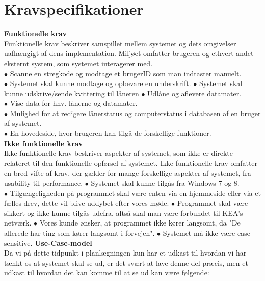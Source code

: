 \documentclass[a4paper]{article}
\begin{document}
\section{Kravspecifikationer}
\textbf{Funktionelle krav}\\
Funktionelle krav beskriver samspillet mellem systemet og dets omgivelser uafhængigt af dens implementation. Miljøet omfatter brugeren og ethvert andet eksternt system, som systemet interagerer med. \cite{OOSE} \\
$\bullet$ Scanne en stregkode og modtage et brugerID som man indtaster manuelt. \\
$\bullet$ Systemet skal kunne modtage og opbevare en underskrift.
$\bullet$ Systemet skal kunne udskrive/sende kvittering til låneren
$\bullet$ Udlåne og aflevere datamater. \\
$\bullet$ Vise data for hhv. lånerne og datamater. \\
$\bullet$ Mulighed for at redigere lånerstatus og computerstatus i databasen af en bruger af systemet. \\
$\bullet$ En hovedeside, hvor brugeren kan tilgå de forskellige funktioner.\\
\textbf{Ikke funktionelle krav}\\
Ikke-funktionelle krav beskriver aspekter af systemet, som ikke er direkte relateret til den funktionelle opførsel af systemet. Ikke-funktionelle krav omfatter en bred vifte af krav, der gælder for mange forskellige aspekter af systemet, fra usability til performance. \cite{OOSE}
$\bullet$ Systemet skal kunne tilgås fra Windows 7 og 8. \\
$\bullet$ Tilgængeligheden på programmet skal være enten via en hjemmeside eller via et fælles drev, dette vil blive uddybet efter vores møde.
$\bullet$ Programmet skal være sikkert og ikke kunne tilgås udefra, altså skal man være forbundet til KEA's netværk.
$\bullet$ Vores kunde ønsker, at programmet ikke kører langsomt, da "De allerede har ting som kører langsomt i forvejen".
$\bullet$ Systemet må ikke være case-sensitive.
\newpage
\textbf{Use-Case-model}\\
Da vi på dette tidpunkt i planlægningen kun har et udkast til hvordan vi har tænkt os at systemet skal se ud, er det svært at lave denne del præcis, men et udkast til hvordan det kan komme til at se ud kan være følgende:\\
\end{document}
